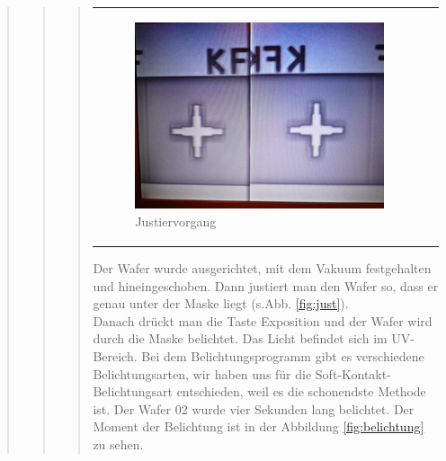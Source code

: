 \begin{quote}
\begin{quote}
\begin{quote}
\begin{center}
\begin{tabular}{ll}
\begin{minipage}{0.6\textwidth}
                        \begin{figure}[H]
                        \hspace{-1em}
                            \includegraphics[scale=0.9, trim = 0cm 0cm 0cm
                            0cm, clip]
                            {./HerstellungBilder/Justiervorgang.png}
                            \caption{Justiervorgang}
                           \label{fig:Justiervorgang}
                        \end{figure}
                    \vspace{-1.5em}

                    \end{minipage}

                \end{tabular}
			\end{center}
    
    		\vspace{2em}
    		
    		Der Wafer wurde ausgerichtet, mit dem Vakuum festgehalten und 
    		hineingeschoben. Dann justiert man den Wafer so, dass er genau unter 
    		der Maske liegt (s.Abb. \ref{fig:just}).\\

			Danach drückt man die Taste Exposition und der Wafer wird durch die 
			Maske belichtet. Das Licht befindet sich im UV-Bereich. Bei dem 
			Belichtungsprogramm gibt es verschiedene Belichtungsarten, wir haben 
			uns für die Soft-Kontakt-Belichtungsart entschieden, weil es die 
			schonendste Methode ist. Der Wafer 02 wurde vier Sekunden lang
			belichtet. Der Moment der Belichtung ist in der Abbildung 
			\ref{fig:belichtung} zu sehen.
    		

\end{quote}
\end{quote}
\end{quote}
